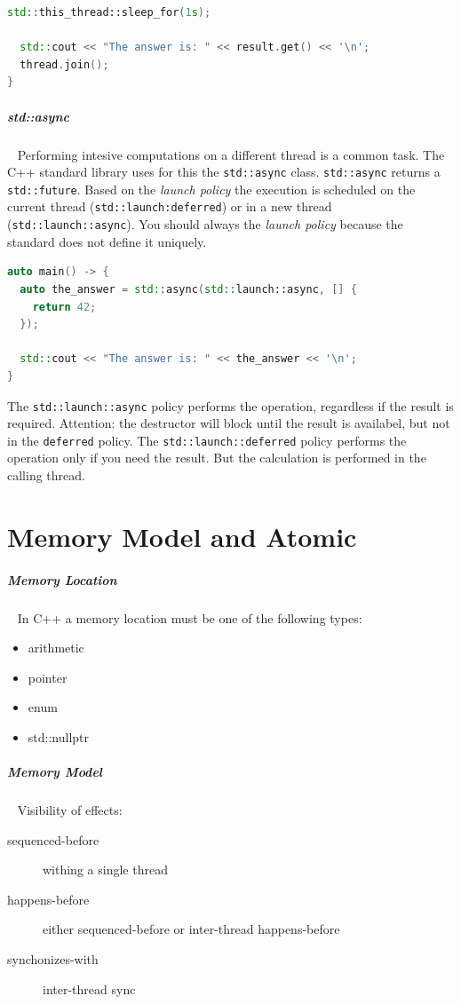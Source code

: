 \documentclass[11pt,twoside,landscape]{article}
\begin{document}
\begin{multicols}{2}
\begin{lstlisting}[language=c++,label=lst:org4c46362,caption={Example usage for future and promise},captionpos=b,numbers=none]
  std::this_thread::sleep_for(1s);

  std::cout << "The answer is: " << result.get() << '\n';
  thread.join();
}
\end{lstlisting}

\subparagraph{std::async} \
\label{sec:org9384916}
Performing intesive computations on a different thread is a common task.
The C++ standard library uses for this the \texttt{std::async} class.
\texttt{std::async} returns a \texttt{std::future}.
Based on the \emph{launch policy} the execution is scheduled on the current thread (\texttt{std::launch:deferred}) or in a new thread (\texttt{std::launch::async}).
You should always the \emph{launch policy} because the standard does not define it uniquely. 

\begin{lstlisting}[language=c++,label=lst:orge9448e6,caption={Example usage for std::async},captionpos=b,numbers=none]
auto main() -> {
  auto the_answer = std::async(std::launch::async, [] {
    return 42;
  });

  std::cout << "The answer is: " << the_answer << '\n';
}
\end{lstlisting}

The \texttt{std::launch::async} policy performs the operation, regardless if the result is required.
Attention: the destructor will block until the result is availabel, but not in the \texttt{deferred} policy.
The \texttt{std::launch::deferred} policy performs the operation only if you need the result.
But the calculation is performed in the calling thread.

\section{Memory Model and Atomic}
\label{sec:org737d361}
\subparagraph{Memory Location} \
\label{sec:orgf4dc6b5}
In C++ a memory location must be one of the following types:
\begin{itemize}
\item arithmetic
\item pointer
\item enum
\item std::nullptr
\end{itemize}

\subparagraph{Memory Model} \
\label{sec:orgc52f9db}
Visibility of effects:
\begin{description}
\item[{sequenced-before}] withing a single thread
\item[{happens-before}] either sequenced-before or inter-thread happens-before
\item[{synchonizes-with}] inter-thread sync
\end{description}



\end{multicols}
\end{document}
